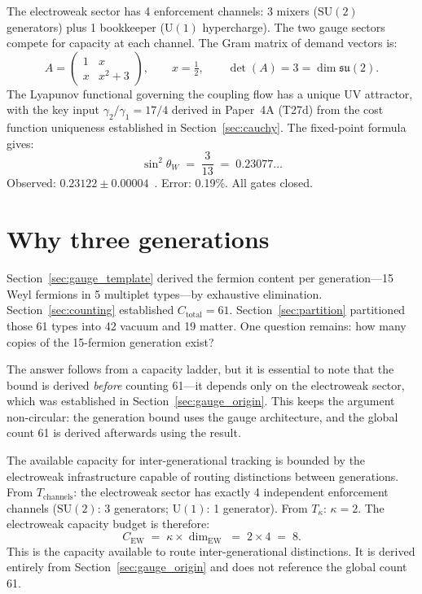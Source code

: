 \documentclass[11pt]{article}
\newcommand{\SU}{\mathrm{SU}}
\newcommand{\U}{\mathrm{U}}
\begin{document}
The electroweak sector has 4 enforcement channels: 3 mixers ($\SU(2)$ generators) plus 1 bookkeeper ($\U(1)$ hypercharge).  The two gauge sectors compete for capacity at each channel.  The Gram matrix of demand vectors is:
\begin{equation}
A = \begin{pmatrix} 1 & x \\ x & x^2 + 3 \end{pmatrix}, \qquad x = \tfrac{1}{2}, \qquad \det(A) = 3 = \dim\mathfrak{su}(2).
\label{eq:weinberg_matrix}
\end{equation}
The Lyapunov functional governing the coupling flow has a unique UV attractor, with the key input $\gamma_2/\gamma_1 = 17/4$ derived in Paper~4A (T27d) from the cost function uniqueness established in Section~\ref{sec:cauchy}.  The fixed-point formula gives:
\begin{equation}
\sin^2\!\theta_W \;=\; \frac{3}{13} \;=\; 0.23077\ldots
\label{eq:weinberg_value}
\end{equation}
Observed: $0.23122 \pm 0.00004$~\cite{PDG2024}.  Error: 0.19\%.  All gates closed.


\section{Why three generations}
\label{sec:generations}

Section~\ref{sec:gauge_template} derived the fermion content per generation---15 Weyl fermions in 5 multiplet types---by exhaustive elimination.  Section~\ref{sec:counting} established $C_{\mathrm{total}} = 61$.  Section~\ref{sec:partition} partitioned those 61 types into 42 vacuum and 19 matter.  One question remains: how many copies of the 15-fermion generation exist?

The answer follows from a capacity ladder, but it is essential to note that the bound is derived \emph{before} counting 61---it depends only on the electroweak sector, which was established in Section~\ref{sec:gauge_origin}.  This keeps the argument non-circular: the generation bound uses the gauge architecture, and the global count 61 is derived afterwards using the result.

The available capacity for inter-generational tracking is bounded by the electroweak infrastructure capable of routing distinctions between generations.  From $T_{\mathrm{channels}}$: the electroweak sector has exactly 4 independent enforcement channels ($\SU(2)$: 3 generators; $\U(1)$: 1 generator).  From $T_\kappa$: $\kappa = 2$.  The electroweak capacity budget is therefore:
\begin{equation}
C_{\mathrm{EW}} \;=\; \kappa \times \dim_{\mathrm{EW}} \;=\; 2 \times 4 \;=\; 8.
\label{eq:c_ew}
\end{equation}
This is the capacity available to route inter-generational distinctions.  It is derived entirely from Section~\ref{sec:gauge_origin} and does not reference the global count 61.
\end{document}
